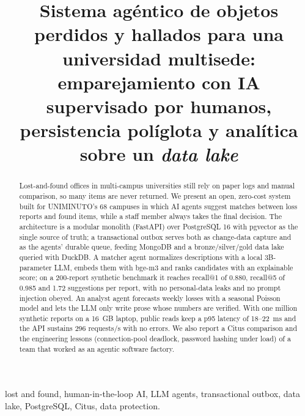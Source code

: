 \documentclass[conference]{IEEEtran}
\begin{document}
\title{Sistema agéntico de objetos perdidos y hallados para una universidad multisede: emparejamiento con IA supervisado por humanos, persistencia políglota y analítica sobre un \emph{data lake}}

\author{
\and
{}
\and
{}
\and
{}
}

\maketitle

\begin{otherlanguage}{english}
\begin{abstract}
Lost-and-found offices in multi-campus universities still rely on paper logs and manual comparison, so many items are never returned. We present an open, zero-cost system built for UNIMINUTO's 68 campuses in which AI agents suggest matches between loss reports and found items, while a staff member always takes the final decision. The architecture is a modular monolith (FastAPI) over PostgreSQL 16 with pgvector as the single source of truth; a transactional outbox serves both as change-data capture and as the agents' durable queue, feeding MongoDB and a bronze/silver/gold data lake queried with DuckDB. A matcher agent normalizes descriptions with a local 3B-parameter LLM, embeds them with bge-m3 and ranks candidates with an explainable score; on a 200-report synthetic benchmark it reaches recall@1 of 0.880, recall@5 of 0.985 and 1.72 suggestions per report, with no personal-data leaks and no prompt injection obeyed. An analyst agent forecasts weekly losses with a seasonal Poisson model and lets the LLM only write prose whose numbers are verified. With one million synthetic reports on a 16~GB laptop, public reads keep a p95 latency of 18--22~ms and the API sustains 296 requests/s with no errors. We also report a Citus comparison and the engineering lessons (connection-pool deadlock, password hashing under load) of a team that worked as an agentic software factory.
\end{abstract}
\begin{IEEEkeywords}
lost and found, human-in-the-loop AI, LLM agents, transactional outbox, data lake, PostgreSQL, Citus, data protection.
\end{IEEEkeywords}
\end{otherlanguage}
\end{document}
